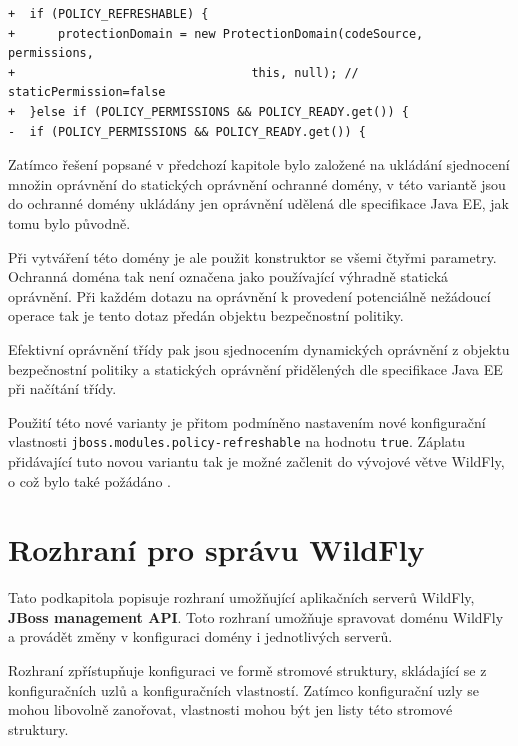 \begin{lstlisting}[caption=Hlavní část záplaty umožňující nastavit používání dynamických oprávnění, label=refreshable]
+  if (POLICY_REFRESHABLE) {
+      protectionDomain = new ProtectionDomain(codeSource, permissions,
+                                 this, null); // staticPermission=false
+  }else if (POLICY_PERMISSIONS && POLICY_READY.get()) {
-  if (POLICY_PERMISSIONS && POLICY_READY.get()) {
\end{lstlisting}

Zatímco řešení popsané v předchozí kapitole bylo založené na ukládání sjednocení množin oprávnění do statických oprávnění ochranné domény, v této variantě jsou do ochranné domény ukládány jen oprávnění udělená dle specifikace Java EE, jak tomu bylo původně.

Při vytváření této domény je ale použit konstruktor se všemi čtyřmi parametry. Ochranná doména tak není označena jako používající výhradně statická oprávnění.
Při každém dotazu na oprávnění k provedení potenciálně nežádoucí operace tak je tento dotaz předán objektu bezpečnostní politiky.

Efektivní oprávnění třídy pak jsou sjednocením dynamických oprávnění z objektu bezpečnostní politiky a statických oprávnění přidělených dle specifikace Java EE při načítání třídy.

Použití této nové varianty je přitom podmíněno nastavením nové konfigurační vlastnosti {\tt jboss.modules.policy-refreshable} na hodnotu {\tt true}.
Záplatu přidávající tuto novou variantu tak je možné začlenit do vývojové větve WildFly, o což bylo také požádáno \cite{jmPullRequest}.

\section{Rozhraní pro správu WildFly} \label{managementAPI}

Tato podkapitola popisuje rozhraní umožňující aplikačních serverů WildFly, {\bf JBoss management API}.
Toto rozhraní umožňuje spravovat doménu WildFly a provádět změny v konfiguraci domény i jednotlivých serverů.
\cite{jbossDetypedManagement}

Rozhraní zpřístupňuje konfiguraci ve formě stromové struktury, skládající se z konfiguračních uzlů a konfiguračních vlastností.
Zatímco konfigurační uzly se mohou libovolně zanořovat, vlastnosti mohou být jen listy této stromové struktury.
\cite{jbossDetypedManagement}

